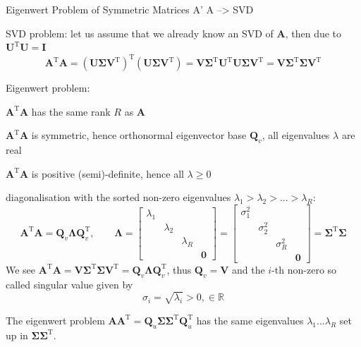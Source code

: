 \documentclass[mathserif, aspectratio=1610]{intbeamer}
\begin{document}
\begin{frame}{Eigenwert Problem of Symmetric Matrices A' A --> SVD}

SVD problem: let us assume that we already know an SVD of $\bm{A}$, then due to $\bm{U}^\mathrm{T} \bm{U} = \bm{I}$
$$
\bm{A}^\mathrm{T} \bm{A}
= (\bm{U}\bm{\Sigma}\bm{V}^\mathrm{T})^\mathrm{T} (\bm{U}\bm{\Sigma}\bm{V}^\mathrm{T})
= \bm{V} \bm{\Sigma}^\mathrm{T} \bm{U}^\mathrm{T} \bm{U} \bm{\Sigma} \bm{V}^\mathrm{T}
= \bm{V} \bm{\Sigma}^\mathrm{T} \bm{\Sigma} \bm{V}^\mathrm{T}
$$

Eigenwert problem:

$\bm{A}^\mathrm{T} \bm{A}$ has the same rank $R$ as $\bm{A}$

$\bm{A}^\mathrm{T} \bm{A}$ is symmetric, hence orthonormal eigenvector base $\bm{Q}_v$, all eigenvalues $\lambda$ are real

$\bm{A}^\mathrm{T} \bm{A}$ is positive (semi)-definite, hence all $\lambda \geq 0$

diagonalisation with the sorted non-zero eigenvalues $\lambda_1 > \lambda_2 > ... > \lambda_R$:
$$
\bm{A}^\mathrm{T} \bm{A} = \bm{Q}_v \bm{\Lambda} \bm{Q}^\mathrm{T}_v,\qquad
\bm{\Lambda} =
\begin{bmatrix}
\lambda_1 & & &\\
& \lambda_2 & &\\
&  & \lambda_R&\\
&  & & \bm{0}
\end{bmatrix}=
\begin{bmatrix}
\sigma^2_1 & & &\\
& \sigma^2_2 & &\\
&  & \sigma^2_R&\\
&  & & \bm{0}
\end{bmatrix}=
\bm{\Sigma}^\mathrm{T} \bm{\Sigma}
$$
We see $\bm{A}^\mathrm{T} \bm{A} = \bm{V} \bm{\Sigma}^\mathrm{T} \bm{\Sigma} \bm{V}^\mathrm{T} = \bm{Q}_v \bm{\Lambda} \bm{Q}^\mathrm{T}_v$,
thus
$\bm{Q}_v = \bm{V}$
and the $i$-th non-zero so called singular value given by
$$\sigma_i = \sqrt{\lambda_i}>0, \in \mathbb{R}$$

The eigenwert problem $\bm{A} \bm{A}^\mathrm{T} = \bm{Q}_u \bm{\Sigma}  \bm{\Sigma}^\mathrm{T} \bm{Q}_u^\mathrm{T}$
has the same eigenvalues $\lambda_1...\lambda_R$ set up in $\bm{\Sigma}  \bm{\Sigma}^\mathrm{T}$.
\end{frame}
\end{document}
